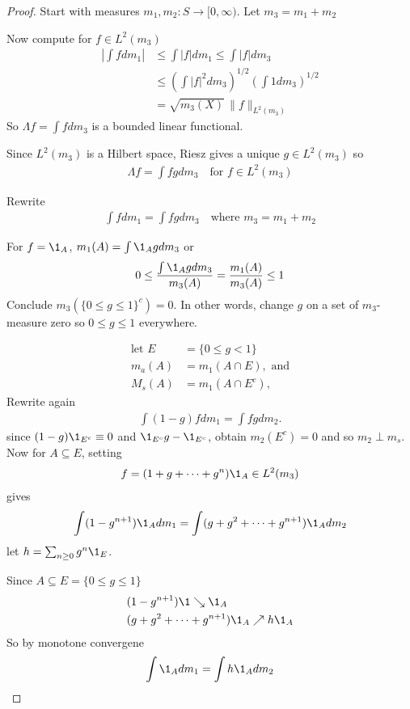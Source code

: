 \begin{proof}
	Start with measures $m_1, m_2 :S \to [0,\infty)$.
	Let  $m_3 = m_1 + m_2$

	Now compute for  $f \in L^2 (m_3)$
	\begin{align*}
		\left| \int f dm_1 \right| &\leq \int |f| dm_1 \leq \int |f| dm_3 \\
						&\leq \left( \int |f|^2 dm_3 \right)^{1/2} \left( \int 1 dm_3 \right)^{1/2}\\
						&= \sqrt{m_3 (X)} \, \|f\|_{L^{2}(m_3)}
	\end{align*}
	So $\Lambda f = \int f dm_3$ is a bounded linear functional.

	Since $L^{2} (m_3)$ is a Hilbert space, Riesz gives a unique $g \in L^{2} (m_3)$ so
	\begin{align*}
		\Lambda f = \int f g dm_3 \quad \text{for } f \in L^{2}(m_3)
	\end{align*}

	Rewrite
	\begin{align*}
		\int f dm_1 = \int f g d m_3 \quad \text{where $m_3 = m_1 + m_2$}
	\end{align*}

	For $f = \1_{A}$, $m_1 (A) = \int \1_{A} g dm_3$ or
	\begin{align*}
		0 \leq \frac{\int \1_{A} g dm_3}{m_3 (A)} = \frac{ m_1 (A)}{m_3 (A)} \leq 1
	\end{align*}
	Conclude $m_3 (\{0 \leq g \leq 1\}^c) = 0$. In other words, change $g$ on a set of $m_3$-measure zero so $0 \leq g \leq 1$ everywhere.

	\begin{align*}
		\text{let  } E &= \{ 0 \leq g < 1 \} \\
		m_a (A) &= m_1 (A \cap E), \text{ and} \\
		M_s (A) &= m_1 (A \cap E^c),
	\end{align*}
	Rewrite again
	\begin{align*}
		\int (1 - g) f dm_1 = \int fg dm_2.
	\end{align*}
	since $(1 - g) \1_{E^c} \equiv 0$ and $\1_{E^c} g - \1_{E^c}$, obtain $m_2 (E^c) = 0$
	and so $m_2 \perp m_s$.  \\


	Now for  $A \subseteq E$, setting
	\begin{align*}
		f = (1 + g + \cdots + g^n) \1_{A } \in L^2 (m_3)
	\end{align*} gives
	\begin{align*}
		\int ( 1 - g^{n+1}) \1_{A} dm_1 = \int (g + g^2 + \cdots + g^{n+1}) \1_{A} dm_2
	\end{align*}
	let $h = \sum_{n \geq 0} g^{n} \1_{E}$.

	Since $A \subseteq E = \{ 0 \leq g \leq 1\}$
	\begin{align*}
		&(1 - g^{n+1}) \1 \searrow \1_{A} \\
		&(g + g^2 + \cdots + g^{n+1} ) \1_{A} \nearrow h \1_{A}
	\end{align*}
	So by monotone convergene
	\begin{align*}
		\int \1_{A} dm_1 = \int h \1_{A} dm_2
	\end{align*}
\end{proof}




